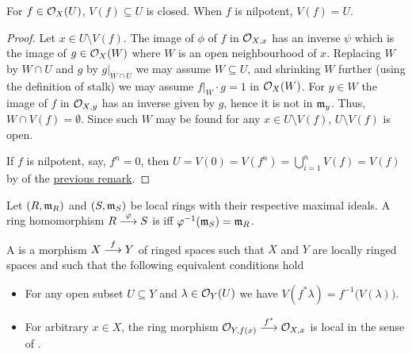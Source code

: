 \documentclass[a4paper,parskip=half,numbers=enddot, DIV=12]{scrreprt}
\begin{document}
\begin{fact}
    For $f\in\mathcal{O}_X(U)$, $V(f)\subseteq U$ is closed. When $f$ is nilpotent, $V(f) = U$.
\end{fact}
\begin{proof}
    Let $x\in U\setminus V(f)$. The image of $\phi$ of $f$ in $\mathcal{O}_{X,x}$ has an inverse $\psi$ which is the image of $g\in \mathcal{O}_X(W)$ where $W$ is an open neighbourhood of $x$. Replacing $W$ by $W\cap U$ and $g$ by $g|_{W\cap U}$  we may assume $W\subseteq U$, and shrinking $W$ further (using the definition of stalk) we may assume $f|_W\cdot g = 1$ in $\mathcal{O}_X(W)$. For $y\in W$ the image of $f$ in $\mathcal{O}_{X,y}$ has an inverse given by $g$, hence it is not in $\mathfrak{m}_y$. Thus, $W\cap V(f) = \emptyset$. Since such $W$ may be found for any $x\in U\setminus V(f)$, $U\setminus V(f)$ is open.
    
    If $f$ is nilpotent, say, $f^n=0$, then $U=V(0)=V(f^n)=\bigcup_{i=1}^nV(f)=V(f)$ by  of the \hyperref[rem:stuffAboutV(f)]{previous remark}.
\end{proof}
\begin{defi}
    \begin{alphanumerate}
        \item {}
            Let $(R,\mathfrak{m}_R)$ and $(S,\mathfrak{m}_S)$ be local rings with their respective maximal ideals. A ring homomorphism $R\morphism[\phi] S$ is  iff $\varphi^{-1}(\mathfrak{m}_S) = \mathfrak{m}_R$.
        \item 
            A  is a morphism $X\morphism[f] Y$ of ringed spaces such that $X$ and $Y$ are locally ringed spaces and such that the following equivalent conditions hold
            \begin{itemize}
              \item[\itememph{\alpha}]
                For any open subset $U\subseteq Y$ and $\lambda\in \mathcal{O}_Y(U)$ we have $V(f^*\lambda) = f^{-1}\big(V(\lambda)\big)$.
              \item[\itememph{\beta}]
                For arbitrary $x\in X$, the ring morphism $\Oo_{Y,f(x)} \morphism[f^*]\Oo_{X,x}$ is local in the sense of .
            \end{itemize}

    \end{alphanumerate}
\end{defi}
\end{document}
